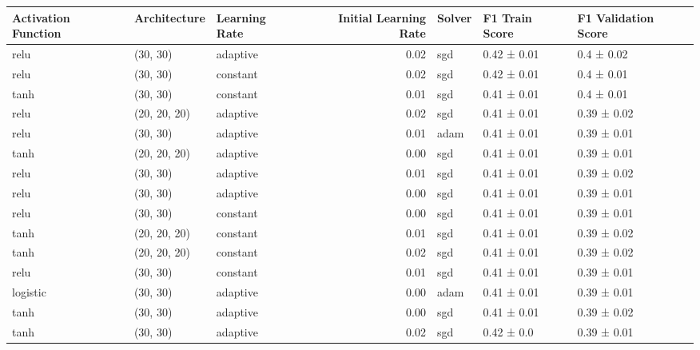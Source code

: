 \begin{tabular}{lllrlll}
\toprule
Activation Function & Architecture & Learning Rate & Initial Learning Rate & Solver & F1 Train Score & F1 Validation Score \\
\midrule
relu & (30, 30) & adaptive & 0.02 & sgd & 0.42 ± 0.01 & 0.4 ± 0.02 \\
relu & (30, 30) & constant & 0.02 & sgd & 0.42 ± 0.01 & 0.4 ± 0.01 \\
tanh & (30, 30) & constant & 0.01 & sgd & 0.41 ± 0.01 & 0.4 ± 0.01 \\
relu & (20, 20, 20) & adaptive & 0.02 & sgd & 0.41 ± 0.01 & 0.39 ± 0.02 \\
relu & (30, 30) & adaptive & 0.01 & adam & 0.41 ± 0.01 & 0.39 ± 0.01 \\
tanh & (20, 20, 20) & adaptive & 0.00 & sgd & 0.41 ± 0.01 & 0.39 ± 0.01 \\
relu & (30, 30) & adaptive & 0.01 & sgd & 0.41 ± 0.01 & 0.39 ± 0.02 \\
relu & (30, 30) & adaptive & 0.00 & sgd & 0.41 ± 0.01 & 0.39 ± 0.01 \\
relu & (30, 30) & constant & 0.00 & sgd & 0.41 ± 0.01 & 0.39 ± 0.01 \\
tanh & (20, 20, 20) & constant & 0.01 & sgd & 0.41 ± 0.01 & 0.39 ± 0.02 \\
tanh & (20, 20, 20) & constant & 0.02 & sgd & 0.41 ± 0.01 & 0.39 ± 0.02 \\
relu & (30, 30) & constant & 0.01 & sgd & 0.41 ± 0.01 & 0.39 ± 0.01 \\
logistic & (30, 30) & adaptive & 0.00 & adam & 0.41 ± 0.01 & 0.39 ± 0.01 \\
tanh & (30, 30) & adaptive & 0.00 & sgd & 0.41 ± 0.01 & 0.39 ± 0.02 \\
tanh & (30, 30) & adaptive & 0.02 & sgd & 0.42 ± 0.0 & 0.39 ± 0.01 \\
\bottomrule
\end{tabular}
